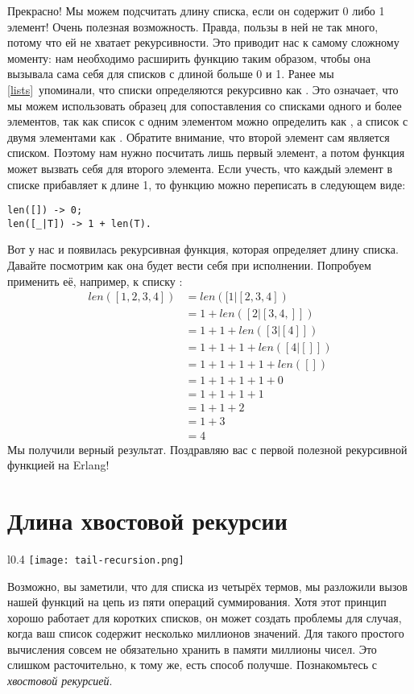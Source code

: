Прекрасно! Мы можем подсчитать длину списка, если он содержит 0 либо 1 элемент! Очень полезная возможность. Правда, пользы в ней не так много, потому что ей не хватает рекурсивности. Это приводит нас к самому сложному моменту: нам необходимо расширить функцию таким образом, чтобы она вызывала сама себя для списков с длиной больше 0 и 1. Ранее мы \ref{lists}~упоминали, что списки определяются рекурсивно как . Это означает, что мы можем использовать образец \ops{[H|T]} для сопоставления со списками одного и более элементов, так как список с одним элементом можно определить как \ops{[X|[]]}, а список с двумя элементами как . Обратите внимание, что второй элемент сам является списком. Поэтому нам нужно посчитать лишь первый элемент, а потом функция может вызвать себя для второго элемента. Если учесть, что каждый элемент в списке прибавляет к длине 1, то функцию можно переписать в следующем виде:
\begin{lstlisting}[style=erlang]
len([]) -> 0;
len([_|T]) -> 1 + len(T).
\end{lstlisting}

Вот у нас и появилась рекурсивная функция, которая определяет длину списка. Давайте посмотрим как она будет вести себя при исполнении. Попробуем применить её, например, к списку \ops{[1,2,3,4]}: \begin{align*}
len([1,2,3,4]) &= len([1 | [2,3,4])\\
&= 1 + len([2 | [3,4,]])\\
&= 1 + 1 + len([3 | [4]])\\
&= 1 + 1 + 1 + len([4 | []])\\
&= 1 + 1 + 1 + 1 + len([])\\
&= 1 + 1 + 1 + 1 + 0\\
&= 1 + 1 + 1 + 1\\
&= 1 + 1 + 2\\
&= 1 + 3\\
&= 4
\end{align*}
Мы получили верный результат. Поздравляю вас с первой полезной рекурсивной функцией на Erlang!
\section{Длина хвостовой рекурсии}
\label{length-of-a-tail-recursion}

\begin{wrapfigure}{l}{0.4\linewidth}
    \texttt{[image: tail-recursion.png]}
\end{wrapfigure}
Возможно, вы заметили, что для списка из четырёх термов, мы разложили вызов нашей функций на цепь из пяти операций суммирования. Хотя этот принцип хорошо работает для коротких списков, он может создать проблемы для случая, когда ваш список содержит несколько миллионов значений. Для такого простого вычисления совсем не обязательно хранить в памяти миллионы чисел. Это слишком расточительно, к тому же, есть способ получше. Познакомьтесь с \emph{хвостовой рекурсией}.

